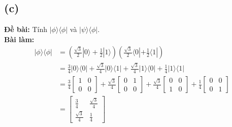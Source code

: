\subsection{(c)}
\textbf{Đề bài:} Tính $|\phi\rangle\langle\phi|$ và $|\psi\rangle\langle\phi|$.\\
\textbf{Bài làm:}
\begin{align*}
    |\phi\rangle\langle\phi| & = \left(\frac{\sqrt{3}}{2}|0\rangle+\frac{1}{2}|1\rangle\right)\left(\frac{\sqrt{3}}{2}\langle0|+\frac{1}{2}\langle1|\right)                  \\
                             & = \frac{3}{4}|0\rangle\langle0| + \frac{\sqrt{3}}{4}|0\rangle\langle1| + \frac{\sqrt{3}}{4}|1\rangle\langle0| + \frac{1}{4}|1\rangle\langle1| \\
                             & = \frac{3}{4} \begin{bmatrix}
                                                 1 & 0 \\
                                                 0 & 0
                                             \end{bmatrix}
    + \frac{\sqrt{3}}{4} \begin{bmatrix}
                             0 & 1 \\
                             0 & 0
                         \end{bmatrix}
    + \frac{\sqrt{3}}{4} \begin{bmatrix}
                             0 & 0 \\
                             1 & 0
                         \end{bmatrix}
    + \frac{1}{4} \begin{bmatrix}
                      0 & 0 \\
                      0 & 1
                  \end{bmatrix}                                                                                                                                             \\
                             & = \begin{bmatrix}
                                     \frac{3}{4}        & \frac{\sqrt{3}}{4} \\
                                     \frac{\sqrt{3}}{4} & \frac{1}{4}
                                 \end{bmatrix}
\end{align*}
